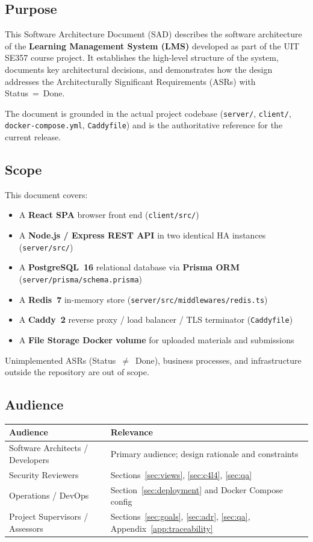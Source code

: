 \documentclass[12pt,a4paper]{article}
\begin{document}
\subsection{Purpose}

This Software Architecture Document (SAD) describes the software architecture of the
\textbf{Learning Management System (LMS)} developed as part of the UIT SE357 course project.
It establishes the high-level structure of the system, documents key architectural decisions,
and demonstrates how the design addresses the Architecturally Significant Requirements (ASRs)
with Status~=~Done.

The document is grounded in the actual project codebase (\texttt{server/},
\texttt{client/}, \texttt{docker-compose.yml}, \texttt{Caddyfile}) and is the
authoritative reference for the current release.

\subsection{Scope}

This document covers:

\begin{itemize}[noitemsep]
  \item A \textbf{React SPA} browser front end (\texttt{client/src/})
  \item A \textbf{Node.js / Express REST API} in two identical HA instances (\texttt{server/src/})
  \item A \textbf{PostgreSQL~16} relational database via \textbf{Prisma ORM} (\texttt{server/prisma/schema.prisma})
  \item A \textbf{Redis~7} in-memory store (\texttt{server/src/middlewares/redis.ts})
  \item A \textbf{Caddy~2} reverse proxy / load balancer / TLS terminator (\texttt{Caddyfile})
  \item A \textbf{File Storage Docker volume} for uploaded materials and submissions
\end{itemize}

Unimplemented ASRs (Status~$\neq$~Done), business processes, and infrastructure outside the
repository are out of scope.

\subsection{Audience}

\begin{tabularx}{\textwidth}{L{4.5cm} L{9cm}}
  \toprule
  \textbf{Audience} & \textbf{Relevance} \\
  \midrule
  Software Architects / Developers & Primary audience; design rationale and constraints \\
  Security Reviewers & Sections~\ref{sec:views}, \ref{sec:c4l4}, \ref{sec:qa} \\
  Operations / DevOps & Section~\ref{sec:deployment} and Docker Compose config \\
  Project Supervisors / Assessors & Sections~\ref{sec:goals}, \ref{sec:adr}, \ref{sec:qa}, Appendix~\ref{app:traceability} \\
  \bottomrule
\end{tabularx}
\end{document}
